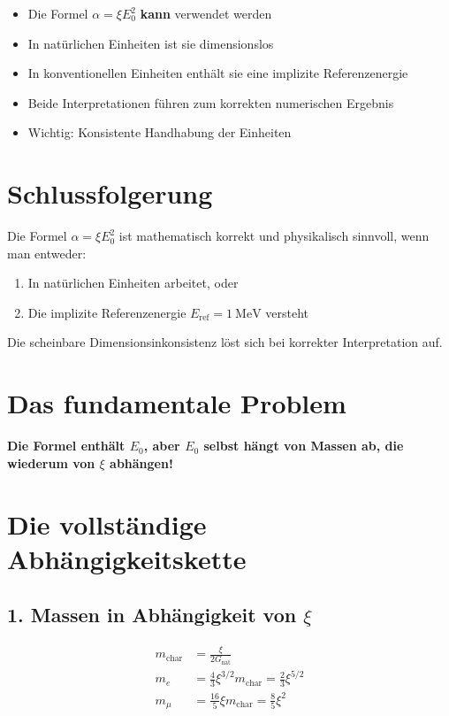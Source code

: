 \documentclass[12pt, a4paper]{article}
\begin{document}
\begin{itemize}
	\item Die Formel $\alpha = \xi E_0^2$ \textbf{kann} verwendet werden
	\item In natürlichen Einheiten ist sie dimensionslos
	\item In konventionellen Einheiten enthält sie eine implizite Referenzenergie
	\item Beide Interpretationen führen zum korrekten numerischen Ergebnis
	\item Wichtig: Konsistente Handhabung der Einheiten
\end{itemize}

\section*{Schlussfolgerung}

Die Formel $\alpha = \xi E_0^2$ ist mathematisch korrekt und physikalisch sinnvoll, wenn man entweder:
\begin{enumerate}
	\item In natürlichen Einheiten arbeitet, oder
	\item Die implizite Referenzenergie $E_{\text{ref}} = \SI{1}{\MeV}$ versteht
\end{enumerate}

Die scheinbare Dimensionsinkonsistenz löst sich bei korrekter Interpretation auf.	

	
\section*{Das fundamentale Problem}

\textbf{Die Formel enthält $E_0$, aber $E_0$ selbst hängt von Massen ab, die wiederum von $\xi$ abhängen!}

\section*{Die vollständige Abhängigkeitskette}

\subsection*{1. Massen in Abhängigkeit von $\xi$}
\begin{align*}
	m_{\text{char}} &= \frac{\xi}{2G_{\text{nat}}} \\
	m_e &= \frac{4}{3} \xi^{3/2} m_{\text{char}} = \frac{2}{3} \xi^{5/2} \\
	m_\mu &= \frac{16}{5} \xi m_{\text{char}} = \frac{8}{5} \xi^2
\end{align*}
\end{document}

